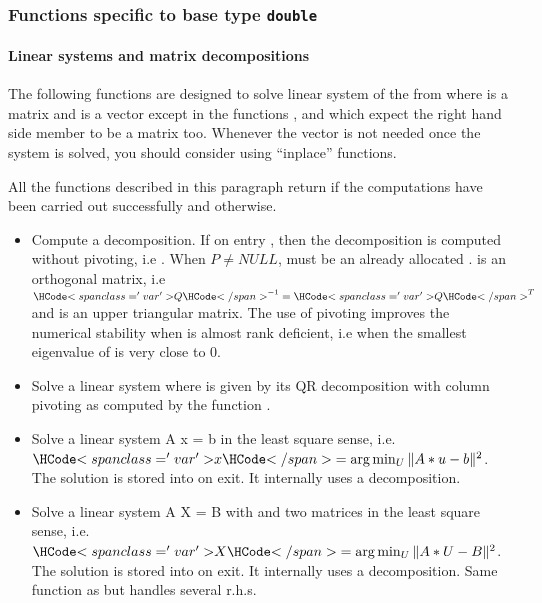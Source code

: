 \subsubsection{Functions specific to base type {\tt double}}


\paragraph{Linear systems and matrix decompositions}

The following functions are designed to solve linear system of the from  where  is a matrix and  is a vector except in the functions
,  and
 which expect the right hand side member to be a
matrix too. Whenever the vector  is not needed once the system is solved,
you should consider using ``inplace'' functions.


All the functions described in this paragraph return  if the
computations have been carried out successfully and  otherwise.

\begin{itemize}
\item {} 
  \sshortdescribe Compute a  decomposition. If on entry
  , then the decomposition is computed without pivoting, i.e
  . When $P \ne NULL$,  must be an already allocated
  \PnlPermutation.  is an orthogonal matrix, i.e
  $\var{Q}^{-1} = \var{Q}^{T}$ and  is an upper triangular matrix. The
  use of pivoting improves the numerical stability when  is almost rank
  deficient, i.e when the smallest eigenvalue of  is very close to $0$.

\item {}
  \sshortdescribe Solve a linear system  where  is given by
  its QR decomposition with column pivoting as computed by the function
  .
\item {}
  \sshortdescribe Solve a linear system A x = b in the least square sense,
  i.e. $\var{x} = \arg\min_U \| A * u - b\|^2$. The solution is stored into
   on exit. It internally uses a  decomposition.

\item {}
  \sshortdescribe Solve a linear system A X = B with  and  two
  matrices in the least square sense, i.e. $\var{X} = \arg\min_U \| A * U -
  B\|^2$. The solution is stored into  on exit. It internally uses a
   decomposition. Same function as  but handles
  several r.h.s.

\end{itemize}

